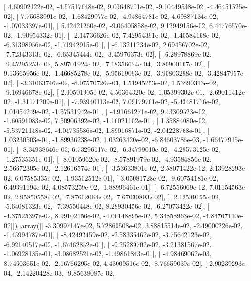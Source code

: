 \documentclass{article}
\begin{document}
       [  4.60902122e-02,  -4.57517648e-02,   9.09648701e-02,
         -9.10449538e-02,  -4.46451525e-02],
       [  7.75683991e-02,  -1.68429977e-02,  -4.94864781e-02,
          4.69887134e-02,  -1.07033397e-01],
       [  5.42421260e-02,  -9.06405858e-02,   9.12949156e-02,
          6.44776570e-02,  -1.90954332e-01],
       [ -2.14736626e-02,   7.42954391e-02,  -1.40584168e-02,
         -6.31398956e-02,  -1.71942915e-01],
       [ -6.13211234e-02,   2.69456702e-02,  -7.72343313e-02,
         -6.65345444e-02,  -3.45976373e-02],
       [ -6.28978869e-02,  -9.45295253e-02,   5.89701924e-02,
         -7.18356624e-04,  -3.80900167e-02],
       [  9.13665956e-02,  -1.46685278e-02,  -5.95619093e-02,
         -3.90803298e-02,  -3.42847957e-02],
       [ -3.31063746e-02,  -8.07570726e-03,   1.51945253e-02,
          1.53890313e-02,  -9.16946678e-02],
       [  2.00501905e-02,   4.56364320e-02,   1.05399302e-01,
         -2.69011412e-02,  -1.31171209e-01],
       [ -7.93940113e-02,   7.09179761e-02,  -5.43481776e-02,
          1.01054249e-02,  -1.57531942e-01],
       [ -4.91661271e-02,   9.43309523e-02,  -1.60591083e-02,
          7.50906392e-02,  -1.16021102e-01],
       [  1.35884080e-02,  -5.53721148e-02,  -4.04735586e-02,
          1.89016871e-02,  -2.04228768e-01],
       [  1.03230503e-01,  -1.89936238e-02,   1.03263420e-02,
         -6.84603786e-03,  -1.66477915e-01],
       [ -8.34938646e-03,   6.73296117e-02,  -6.34799010e-02,
         -4.29573125e-02,  -1.27535351e-01],
       [ -8.01050620e-02,  -8.57891979e-02,  -4.93584856e-02,
          2.56672305e-02,  -2.12616574e-01],
       [ -3.53633801e-02,   2.58071422e-02,   2.13928293e-02,
          6.07585335e-02,  -1.93502512e-01],
       [  3.05081728e-02,  -9.60754181e-02,   6.49391194e-02,
          4.08573259e-02,  -1.88996461e-01],
       [ -6.72556069e-02,   7.01154563e-02,   2.95850558e-02,
         -7.87602064e-02,  -7.67030893e-02],
       [ -2.12539155e-02,  -5.64081323e-02,  -7.39550448e-02,
          8.28930456e-02,  -6.27073422e-02],
       [ -4.37525397e-02,   8.99102156e-02,  -4.06148895e-02,
          5.34858963e-02,  -4.84767110e-02]]), array([[ -3.30997147e-02,   5.72860508e-02,   3.88815514e-02,
         -2.49000226e-02,  -1.45994787e-01],
       [ -8.42492459e-02,  -2.58335462e-02,  -3.75642123e-02,
         -6.92140517e-02,  -1.67462852e-01],
       [ -9.25289702e-02,  -3.21381567e-02,  -1.06928135e-01,
         -3.08682521e-02,  -1.49861843e-01],
       [ -4.98469062e-03,   8.74603651e-02,  -2.16766295e-02,
          4.43009516e-02,  -8.76659039e-02],
       [  2.90239293e-04,  -2.14220428e-03,  -9.85638087e-02,
\end{document}

